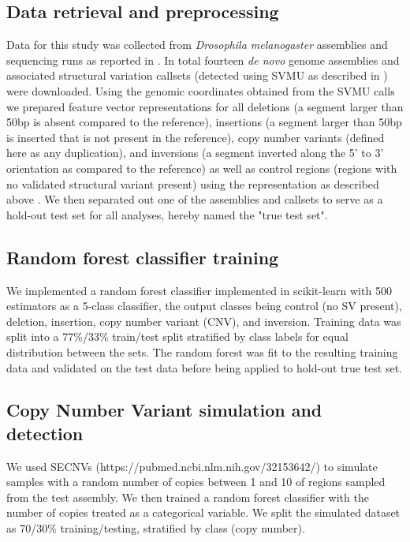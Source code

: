 

\subsection{Data retrieval and preprocessing}

Data for this study was collected from \textit{Drosophila melanogaster} assemblies and sequencing runs as reported in \cite{chakrabortyEvolutionGenomeStructure2021,chakrabortyHiddenGeneticVariation2018,chakrabortyStructuralVariantsExhibit2019}. In total fourteen \textit{de novo} genome assemblies and associated structural variation callsets (detected using SVMU as described in \cite{chakrabortyStructuralVariantsExhibit2019}) were downloaded. Using the genomic coordinates obtained from the SVMU calls we prepared feature vector representations for all deletions (a segment larger than 50bp is absent compared to the reference), insertions (a segment larger than 50bp is inserted that is not present in the reference), copy number variants (defined here as any duplication), and inversions (a segment inverted along the 5' to 3' orientation as compared to the reference) as well as control regions (regions with no validated structural variant present) using the representation as described above \cite{chakrabortyHiddenGeneticVariation2018}. We then separated out one of the assemblies and callsets to serve as a hold-out test set for all analyses, hereby named the "true test set".

\subsection{Random forest classifier training}

We implemented a random forest classifier implemented in scikit-learn with 500 estimators as a 5-class classifier, the output classes being control (no SV present), deletion, insertion, copy number variant (CNV), and inversion. Training data was split into a 77\%/33\% train/test split stratified by class labels for equal distribution between the sets. The random forest was fit to the resulting training data and validated on the test data before being applied to hold-out true test set.

\subsection{Copy Number Variant simulation and detection}

We used SECNVs (https://pubmed.ncbi.nlm.nih.gov/32153642/) to simulate samples with a random number of copies between 1 and 10 of regions sampled from the test assembly. We then trained a random forest classifier with the number of copies treated as a categorical variable. We split the simulated dataset as 70/30\% training/testing, stratified by class (copy number).

